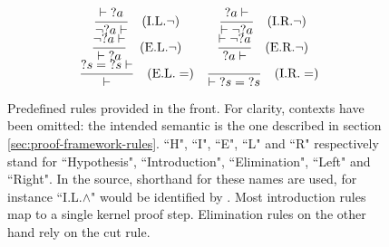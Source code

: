 \begin{figure}[hbt!]
$$\begin{array}{c c}
  \dfrac{\vdash {?a}}{\neg {?a} \vdash} \quad (\text{I.L.} \neg) & \dfrac{{?a} \vdash}{\vdash \neg {?a}} \quad (\text{I.R.} \neg) \\
  \dfrac{\neg {?a} \vdash}{\vdash {?a}} \quad (\text{E.L.} \neg) & \dfrac{\vdash \neg {?a}}{{?a} \vdash} \quad (\text{E.R.} \neg) \\
  \dfrac{{?s} = {?s} \vdash}{\vdash} \quad (\text{E.L.} =) & \dfrac{}{\vdash {?s} = {?s}} \quad (\text{I.R.} =)
  \end{array}$$
  \caption[Rules]{Predefined rules provided in the front. For clarity, contexts have been omitted: the intended semantic is the one described in section \ref{sec:proof-framework-rules}. ``H", ``I", ``E", ``L" and ``R" respectively stand for ``Hypothesis", ``Introduction", ``Elimination", ``Left" and ``Right". In the source, shorthand for these names are used, for instance ``I.L.$\land$" would be identified by . Most introduction rules map to a single kernel proof step. Elimination rules on the other hand rely on the cut rule.}
  \label{fig:rules-list-1}
\end{figure}

